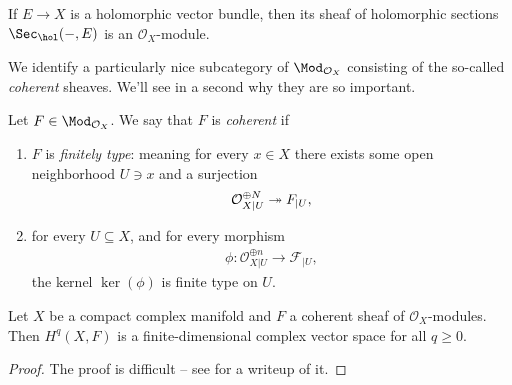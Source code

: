 \documentclass[11pt]{book}
\begin{document}
\begin{example} If $E \to X$ is a holomorphic vector bundle, then its sheaf of holomorphic sections $\Sec_\hol(-,E)$ is an $\mathcal{O}_X$-module.
\end{example}

We identify a particularly nice subcategory of $\Mod_{\mathcal{O}_X}$ consisting of the so-called \emph{coherent} sheaves. We'll see in a second why they are so important.

\begin{definition}\label{def:coherent-OX-module} Let $F\in \Mod_{\mathcal{O}_X}$. We say that $F$ is \emph{coherent} if
\begin{enumerate}
    \item $F$ is \emph{finitely type}: meaning for every $x\in X$ there exists some open neighborhood $U \ni x$ and a surjection
    \begin{align*}
        \mathcal{O}_{X|U}^{\oplus N} \twoheadrightarrow F_{|U},
    \end{align*}
    \item for every $U \subseteq X$, and for every morphism
    \begin{align*}
        \phi \colon \mathcal{O}_{X|U}^{\oplus n} \to \mathcal{F}_{|U},
    \end{align*}
    the kernel $\ker(\phi)$ is finite type on $U$.
\end{enumerate}
\end{definition}

\begin{theorem} Let $X$ be a compact complex manifold and $F$ a coherent sheaf of $\mathcal{O}_X$-modules. Then $H^q(X,F)$ is a finite-dimensional complex vector space for all $q\ge0$.
\end{theorem}
\begin{proof} The proof is difficult -- see \cite[VI.4]{grauertTheorySteinSpaces2004} for a writeup of it.
\end{proof}
\end{document}
